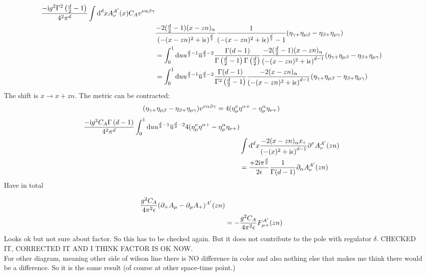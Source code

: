 \begin{align}
	\frac{-\text{i} g^2 \Gamma^2\left( \frac{d}{2}-1\right)}{4^2\pi^d}\int \text{d} ^d x A^{A'}_\nu(x)	C_A  v^{\nu\alpha\beta\gamma}
	\\
	&\frac{-2(\frac{d}{2}-1)(x-zn)_\alpha}{\left(-(x-zn)^2+\text{i} \epsilon\right)^{\frac{d}{2}}}\frac{1}{\left(-(x-zn)^2+\text{i} \epsilon\right)^{\frac{d}{2}}-1}(\eta_{\gamma +}\eta_{\mu \beta}
	-\eta_{\beta +}\eta_{\mu \gamma})
	\\
	&=
	\int_0^1 \text{d} u u^{\frac{d}{2}-1}\overline u^{\frac{d}{2}-2} \frac{\Gamma(d-1)}{\Gamma\left(\frac{d}{2}-1\right)\Gamma\left(\frac{d}{2}\right)}\frac{-2(\frac{d}{2}-1)(x-zn)_\alpha}{\left(-(x-zn)^2+\text{i} \epsilon\right)^{d-1}}(\eta_{\gamma +}\eta_{\mu \beta}
	-\eta_{\beta +}\eta_{\mu \gamma})
	\\
	&=
	\int_0^1 \text{d} u u^{\frac{d}{2}-1}\overline u^{\frac{d}{2}-2} \frac{\Gamma(d-1)}{\Gamma^2\left(\frac{d}{2}-1\right)}\frac{-2(x-zn)_\alpha}{\left(-(x-zn)^2+\text{i} \epsilon\right)^{d-1}}(\eta_{\gamma +}\eta_{\mu \beta}
	-\eta_{\beta +}\eta_{\mu \gamma})
\end{align}
The shift is $x\rightarrow x+zn$.
The metric can be contracted:
\begin{align}
	(\eta_{\gamma +}\eta_{\mu \beta}
	-\eta_{\beta +}\eta_{\mu \gamma})v^{\nu\alpha\beta\gamma}
	&=
	4(\eta_\mu^\nu\eta^{\alpha+}-\eta_\mu^\alpha \eta_{\nu+})
\end{align}
\begin{align}
\frac{-\text{i} g^2 C_A\Gamma\left( d-1\right)}{4^2\pi^d} \int_0^1 \text{d} u u^{\frac{d}{2}-1}\overline u^{\frac{d}{2}-2}4(\eta_\mu^\nu\eta^{\alpha+}-\eta_\mu^\alpha \eta_{\nu+})
\\
&\int \text{d} ^d x\frac{-2(x-zn)_\alpha x_\tau}{\left(-(x)^2+\text{i} \epsilon\right)^{d-1}}\partial^\tau A^{A'}_\nu(zn)
\\
&=
\frac{+2\text{i} \pi^{\frac{d}{2}}}{2\epsilon} \frac{1}{\Gamma(d-1)} \partial_\alpha A^{A'}_\nu(zn)
\end{align}
Have in total

\begin{align}
	\frac{ g^2 C_A}{4\pi^2 \epsilon} 
	(\partial_+A_\mu-\partial_\mu A_+)^{A'}(zn)
	\\
	&=
	-\frac{ g^2 C_A}{4\pi^2 \epsilon} 
	F_{\mu +}^{A'}(zn)
\end{align}
Looks ok but not sure about factor. So this has to be checked again.  But it does not contribute to the pole with regulator $\delta$.
CHECKED IT, CORRECTED IT AND I THINK FACTOR IS OK NOW. \\
For other diagram, meaning other side of wilson line there is NO difference in color and also nothing else that makes me think there would be a difference. So it is the same result (of course at other space-time point.) 

